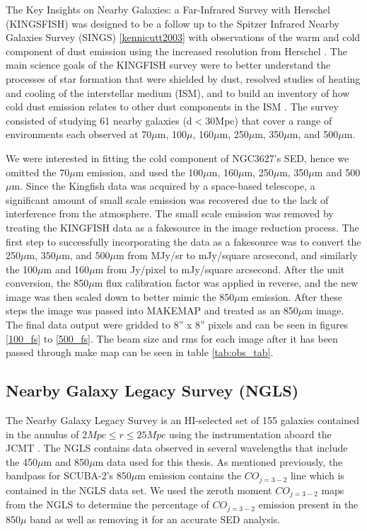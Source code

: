 \begin{table}[h]
The Key Insights on Nearby Galaxies: a Far-Infrared Survey with Herschel (KINGSFISH) was designed to be a follow up to the Spitzer Infrared Nearby Galaxies Survey (SINGS) \ref{kennicutt2003} with observations of the warm and cold component of dust emission using the increased resolution from Herschel \citet{kennicutt2011}.  The main science goals of the KINGFISH survey were to better understand the processes of star formation that were shielded by dust, resolved studies of heating and cooling of the interstellar medium (ISM), and to build an inventory of how cold dust emission relates to other dust components in the ISM \citet{kennicutt2011}.  The survey consisted of studying 61 nearby galaxies (d$<$30Mpc) that cover a range of environments each observed at 70$\mu$m, 100$\mu$, 160$\mu$m, 250$\mu$m, 350$\mu$m, and 500$\mu$m.  

We were interested in fitting the cold component of NGC3627's SED, hence we omitted the 70$\mu$m emission, and used the 100$\mu$m, 160$\mu$m, 250$\mu$m, 350$\mu$m and 500$\mu$m.  Since the Kingfish data was acquired by a space-based telescope, a significant amount of small scale emission was recovered due to the lack of interference from the atmosphere.  The small scale emission was removed by treating the KINGFISH data as a fakesource in the image reduction process.  The first step to successfully incorporating the data as a fakesource was to convert the 250$\mu$m, 350$\mu$m, and 500$\mu$m from MJy/sr to mJy/square arcsecond, and similarly the 100$\mu$m and 160$\mu$m from Jy/pixel to mJy/square arcsecond.   After the unit conversion, the 850$\mu$m flux calibration factor was applied in reverse, and the new image was then scaled down to better mimic the 850$\mu$m emission.  After these steps the image was passed into MAKEMAP and treated as an 850$\mu$m image.  The final data output were gridded to 8'' x 8'' pixels and can be seen in figures \ref{100_fs} to \ref{500_fs}.  The beam size and rms for each image after it has been passed through make map can be seen in table \ref{tab:obs_tab}.


\subsection{Nearby Galaxy Legacy Survey (NGLS)}

The Nearby Galaxy Legacy Survey is an HI-selected set of 155 galaxies contained in the annulus of $2Mpc\leq r \leq25Mpc$ using the instrumentation aboard the JCMT \citet{wilson2012}.  The NGLS contains data observed in several wavelengths that include the 450$\mu$m and 850$\mu$m data used for this thesis.  As mentioned previously, the bandpass for SCUBA-2's 850$\mu$m emission contains the $CO_{j=3-2}$ line which is contained in the NGLS data set.  We used the zeroth moment $CO_{j=3-2}$ maps from the NGLS to determine the percentage of $CO_{j=3-2}$ emission present in the 850$\mu$ band as well as removing it for an accurate SED analysis.  


\end{table}

